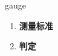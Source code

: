
\begin{frame}
{\huge gauge}
\begin{center}
\begin{enumerate}\Large
  \item \textbf{测量标准}
  \item \textbf{判定}
\end{enumerate}
\end{center}
\end{frame}
